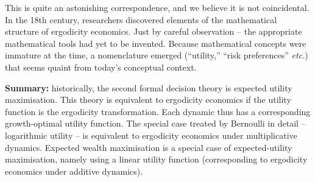 This is quite an astonishing correspondence, and we believe it is not coincidental. In the 18th 
century, researchers discovered elements of the mathematical structure of ergodicity 
economics. Just by careful observation -- the appropriate mathematical tools had yet to be invented. 
Because mathematical concepts were immature at the time, a nomenclature 
emerged (``utility,'' ``risk preferences'' {\it etc.}) that seems quaint from today's 
conceptual context.

{\bf Summary:} historically, the second formal decision theory is expected utility maximisation. 
This theory is equivalent to ergodicity economics if the utility function is the ergodicity 
transformation. Each dynamic thus has a corresponding growth-optimal utility function. 
The special case treated by Bernoulli in detail -- logarithmic utility -- is equivalent to 
ergodicity economics under multiplicative dynamics. Expected wealth maximisation 
is a special case of expected-utility maximisation, namely using a linear utility function 
(corresponding to ergodicity economics under additive dynamics).

